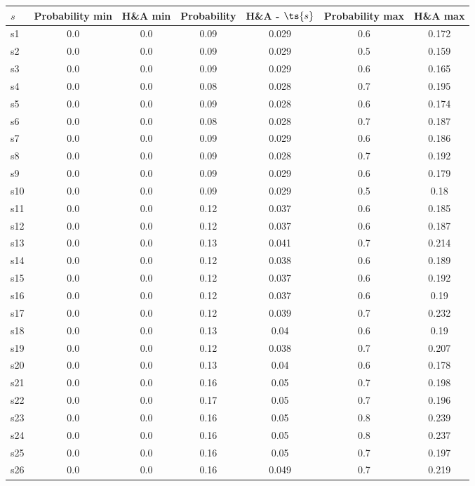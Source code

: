 \documentclass{article}
\begin{document}
\noindent\begin{tabular}{|l|c|c|c|c|c|c|}
\hline
$s$& Probability min & H\&A min & Probability & H\&A - $\ts{s}$ & Probability max & H\&A max\\
\hline
s1 &0.0 & 0.0 & 0.09 & 0.029 & 0.6 & 0.172\\
\hline
s2 &0.0 & 0.0 & 0.09 & 0.029 & 0.5 & 0.159\\
\hline
s3 &0.0 & 0.0 & 0.09 & 0.029 & 0.6 & 0.165\\
\hline
s4 &0.0 & 0.0 & 0.08 & 0.028 & 0.7 & 0.195\\
\hline
s5 &0.0 & 0.0 & 0.09 & 0.028 & 0.6 & 0.174\\
\hline
s6 &0.0 & 0.0 & 0.08 & 0.028 & 0.7 & 0.187\\
\hline
s7 &0.0 & 0.0 & 0.09 & 0.029 & 0.6 & 0.186\\
\hline
s8 &0.0 & 0.0 & 0.09 & 0.028 & 0.7 & 0.192\\
\hline
s9 &0.0 & 0.0 & 0.09 & 0.029 & 0.6 & 0.179\\
\hline
s10 &0.0 & 0.0 & 0.09 & 0.029 & 0.5 & 0.18\\
\hline
s11 &0.0 & 0.0 & 0.12 & 0.037 & 0.6 & 0.185\\
\hline
s12 &0.0 & 0.0 & 0.12 & 0.037 & 0.6 & 0.187\\
\hline
s13 &0.0 & 0.0 & 0.13 & 0.041 & 0.7 & 0.214\\
\hline
s14 &0.0 & 0.0 & 0.12 & 0.038 & 0.6 & 0.189\\
\hline
s15 &0.0 & 0.0 & 0.12 & 0.037 & 0.6 & 0.192\\
\hline
s16 &0.0 & 0.0 & 0.12 & 0.037 & 0.6 & 0.19\\
\hline
s17 &0.0 & 0.0 & 0.12 & 0.039 & 0.7 & 0.232\\
\hline
s18 &0.0 & 0.0 & 0.13 & 0.04 & 0.6 & 0.19\\
\hline
s19 &0.0 & 0.0 & 0.12 & 0.038 & 0.7 & 0.207\\
\hline
s20 &0.0 & 0.0 & 0.13 & 0.04 & 0.6 & 0.178\\
\hline
s21 &0.0 & 0.0 & 0.16 & 0.05 & 0.7 & 0.198\\
\hline
s22 &0.0 & 0.0 & 0.17 & 0.05 & 0.7 & 0.196\\
\hline
s23 &0.0 & 0.0 & 0.16 & 0.05 & 0.8 & 0.239\\
\hline
s24 &0.0 & 0.0 & 0.16 & 0.05 & 0.8 & 0.237\\
\hline
s25 &0.0 & 0.0 & 0.16 & 0.05 & 0.7 & 0.197\\
\hline
s26 &0.0 & 0.0 & 0.16 & 0.049 & 0.7 & 0.219\\

\end{tabular}
\end{document}
